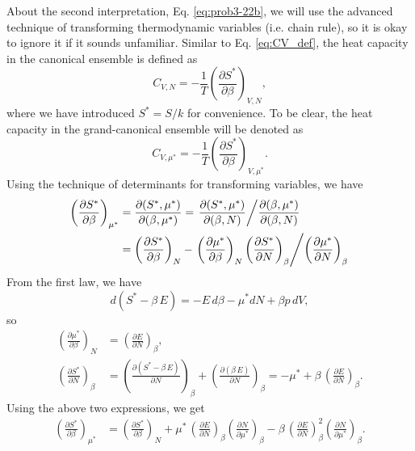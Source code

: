 \documentclass{article}
\begin{document}
About the second interpretation, Eq. \eqref{eq:prob3-22b},
we will use the advanced technique of transforming thermodynamic variables
(i.e. chain rule),
so it is okay to ignore it if it sounds unfamiliar.
%
Similar to Eq. \eqref{eq:CV_def},
the heat capacity in the canonical ensemble is defined as
\begin{equation}
C_{V, N}
= -\frac{1}{T} \left( \frac{ \partial S^* } { \partial \beta } \right)_{V, N},
  \label{eq:CVN_def}
\end{equation}
where we have introduced $S^* = S/k$ for convenience.
%
To be clear, the heat capacity in the grand-canonical ensemble
will be denoted as
\begin{equation}
C_{V, \mu^*} = -\frac{1}{T} \left( \frac{ \partial S^* } { \partial \beta } \right)_{V, \mu^*}.
  \label{eq:CVmu_def}
\end{equation}
%
Using the technique of determinants for transforming variables, we have
\begin{align*}
  \left( \frac{ \partial S^* } {\partial \beta } \right)_{\mu^*}
  &=
  \frac{ \partial (S^*, \mu^*) } { \partial (\beta, \mu^*) }
  =
  \left.
  \frac{ \partial (S^*, \mu^*) } { \partial (\beta, N) }
  \middle/
  \frac{ \partial (\beta, \mu^*) } { \partial (\beta, N) }
  \right.
  \\
  &=
  \left( \frac{ \partial S^* } {\partial \beta } \right)_{N}
  -
  \left.
  \left( \frac{ \partial \mu^* } {\partial \beta } \right)_{N}
  \left( \frac{ \partial S^* } {\partial N } \right)_{\beta}
  \middle/
  \left( \frac{ \partial \mu^* } {\partial N } \right)_{\beta}
  \right.
\end{align*}
From the first law, we have
$$
d(S^* - \beta \, E) = -E \, d\beta -\mu^* dN + \beta p \, dV
,
$$
%
so
\begin{align*}
  \left( \frac{ \partial \mu^* } {\partial \beta } \right)_{N}
  &=
  \left( \frac{ \partial E } {\partial N } \right)_{\beta}
  ,
  \\
  \left( \frac{ \partial S^* } {\partial N } \right)_{\beta}
  &=
  \left( \frac{ \partial (S^* - \beta \, E) } {\partial N } \right)_{\beta}
  +
  \left( \frac{ \partial ( \beta \,  E) } {\partial N } \right)_{\beta}
  =
  -\mu^*
  +
  \beta \, \left( \frac{ \partial E } {\partial N } \right)_{\beta}
  .
\end{align*}
Using the above two expressions, we get
\begin{align*}
  \left( \frac{ \partial S^* } {\partial \beta } \right)_{\mu^*}
  &=
  \left( \frac{ \partial S^* } {\partial \beta } \right)_{N}
  +
  \mu^* \,
  \left( \frac{ \partial E } {\partial N } \right)_{\beta}
  \left( \frac{ \partial N } {\partial \mu^* } \right)_{\beta}
  -
  \beta \,
  \left( \frac{ \partial E } {\partial N } \right)_{\beta}^2
  \left( \frac{ \partial N } {\partial \mu^* } \right)_{\beta}
  .
\end{align*}
\end{document}
